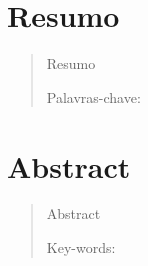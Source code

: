 \chapter*{Resumo}


\begin{quotation}
\noindent Resumo

\vspace*{0.5cm}

\noindent Palavras-chave: 
\end{quotation}


\newpage
\null



\chapter*{Abstract}


\begin{quotation}


\noindent Abstract

\vspace*{0.5cm}

\noindent Key-words: 
\newpage%
\end{quotation}

\newpage
\null

